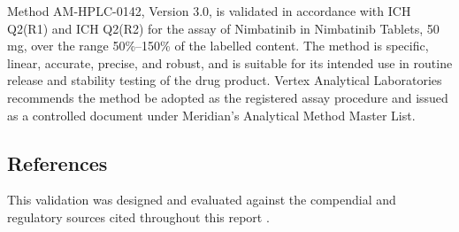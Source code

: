 \begin{verdictbox}
Method AM-HPLC-0142, Version 3.0, is validated in accordance with ICH Q2(R1)
\citep{ich2005q2} and ICH Q2(R2) \citep{ich2023q2} for the assay of Nimbatinib in Nimbatinib
Tablets, 50\,mg, over the range 50\%--150\% of the labelled content. The method is specific,
linear, accurate, precise, and robust, and is suitable for its intended use in routine release
and stability testing of the drug product. Vertex Analytical Laboratories recommends the method
be adopted as the registered assay procedure and issued as a controlled document under
Meridian's Analytical Method Master List.
\end{verdictbox}

\subsection{References}
This validation was designed and evaluated against the compendial and regulatory sources cited
throughout this report \citep{ich2005q2,ich2023q2,usp1225,usp621,fda2015amv,eurachem2014}.


